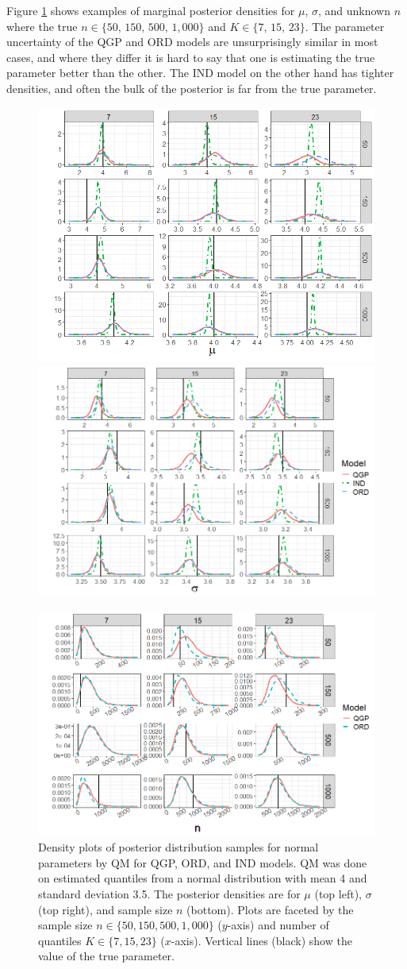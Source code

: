 \documentclass[preprint,12pt,authoryear]{elsarticle}
\begin{document}
Figure \ref{fig:normal_densities} shows examples of marginal posterior densities for $\mu$, $\sigma$, and unknown $n$ where the true $n \in \{50,\,150,\,500,\,1,000\}$ and $K \in \{7,\,15,\,23\}$. 
The parameter uncertainty of the QGP and ORD models are unsurprisingly similar in most cases, and where they differ it is hard to say that one is estimating the true parameter better than the other. The IND model on the other hand has tighter densities, and often the bulk of the posterior is far from the true parameter.
\begin{figure}[hbt!]
  \includegraphics[width=.4\linewidth]{Images/normal_mean_fit.png}
  \includegraphics[width=.4\linewidth]{Images/normal_sd_fit.png}

\medskip %
  \includegraphics[width=.4\linewidth]{Images/normal_n_fit.png}
\tiny
\caption{Density plots of posterior distribution samples for normal parameters by QM for QGP, ORD, and IND models. QM was done on estimated quantiles from a normal distribution with mean 4 and standard deviation 3.5. The posterior densities are for $\mu$ (top left), $\sigma$ (top right), and sample size $n$ (bottom). Plots are faceted by the sample size $n \in \{50, 150, 500, 1{,}000\}$ ($y$-axis) and number of quantiles $K \in \{7, 15, 23\}$ ($x$-axis). Vertical lines (black) show the value of the true parameter.}
\label{fig:normal_densities}
\end{figure}
\end{document}
